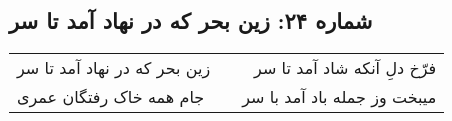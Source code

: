 \begin{center}
\section*{شماره ۲۴: زین بحر که در نهاد آمد تا سر}
\label{sec:024}
\begin{longtable}{l p{0.5cm} r}
زین بحر که در نهاد آمد تا سر
&&
فرّخ دلِ آنکه شاد آمد تا سر
\\
جام همه خاک رفتگان عمری
&&
میبخت وز جمله باد آمد با سر
\\
\end{longtable}
\end{center}
